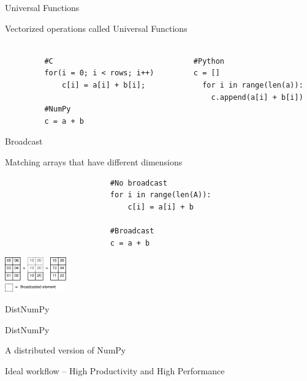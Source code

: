 \documentclass{beamer}
\begin{document}
\begin{frame}[fragile]{Universal Functions}
\begin{center}
Vectorized operations called Universal Functions
\end{center}
\begin{scriptsize}
\begin{verbatim}

         #C                                #Python
         for(i = 0; i < rows; i++)         c = []
             c[i] = a[i] + b[i];             for i in range(len(a)):
                                               c.append(a[i] + b[i])
         #NumPy
         c = a + b
\end{verbatim}
\end{scriptsize}
\end{frame}


\begin{frame}[fragile]{Broadcast}
\begin{center}
Matching arrays that have different dimensions
\end{center}
\begin{scriptsize}
\begin{verbatim}
                        #No broadcast
                        for i in range(len(A)):
                            c[i] = a[i] + b
                  
                        #Broadcast
                        c = a + b
\end{verbatim}
\end{scriptsize}
\begin{center}
\includegraphics[width=100px]{../gfx/ufunc_broadcast}
\end{center}
\end{frame}


\begin{frame}{DistNumPy}
\begin{center}
\begin{Huge}
DistNumPy
\end{Huge}

\vspace{7px}
A distributed version of NumPy

\vspace{25px}
\begin{scriptsize}
Ideal workflow -- High Productivity and High Performance
\end{scriptsize}
\end{center}
\end{frame}
\end{document}
